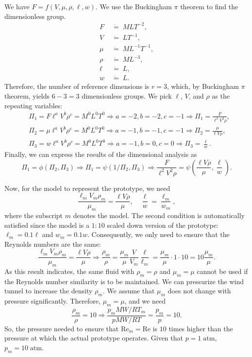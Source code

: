 \documentclass[12pt]{article}
\begin{document}
\begin{ex}
\begin{solution}
  We have $F=f(V,\mu,\rho,\ell,w)$. We use the Buckingham $\pi$ theorem to find the dimensionless group.
  \begin{align*}
    F&\;\dot{=}\;MLT^{-2},\\
    V&\;\dot{=}\;LT^{-1},\\
    \mu&\;\dot{=}\;ML^{-1}T^{-1},\\
    \rho&\;\dot{=}\;ML^{-3},\\
    \ell&\;\dot{=}\;L,\\
    w&\;\dot{=}\;L.
  \end{align*}
  Therefore, the number of reference dimensions is $r=3$, which, by Buckingham $\pi$ theorem, yields $6-3=3$ dimensionless groups. We pick $\ell$, $V$, and $\rho$ as the repeating variables:
  \begin{align*}
    &\Pi_1=F\ell^aV^b\rho^c=M^0L^0T^0\Rightarrow a=-2,b=-2,c=-1\Rightarrow \Pi_1=\frac{F}{\ell^2V^2\rho},\\
    &\Pi_2=\mu\ell^aV^b\rho^c=M^0L^0T^0\Rightarrow a=-1,b=-1,c=-1\Rightarrow \Pi_2=\frac{\mu}{\ell V\rho},\\
    &\Pi_3=w\ell^aV^b\rho^c=M^0L^0T^0\Rightarrow a=-1,b=0,c=0\Rightarrow \Pi_3=\frac{\ell}{w}.
  \end{align*}
  Finally, we can express the results of the dimensional analysis as
  \begin{equation*}
    \Pi_1=\phi\left(\Pi_2,\Pi_3\right)\Rightarrow\Pi_1=\psi\left(1/\Pi_2,\Pi_3\right)\Rightarrow\frac{F}{\ell^2V^2\rho}=\psi\left(\frac{\ell V\rho}{\mu},\frac{\ell}{w}\right).
  \end{equation*}

  Now, for the model to represent the prototype, we need
  \begin{equation*}
    \frac{\ell_m V_m\rho_m}{\mu_m}=\frac{\ell V\rho}{\mu},\quad \frac{\ell}{w}=\frac{\ell_m}{w_m},
  \end{equation*}
  where the subscript $m$ denotes the model. The second condition is automatically satisfied since the model is a $1:10$ scaled down version of the prototype: $\ell_m=0.1\ell$ and $w_m=0.1w$. Consequently, we only need to ensure that the Reynolds numbers are the same:
  \begin{equation*}
    \frac{\ell_m V_m\rho_m}{\mu_m}=\frac{\ell V\rho}{\mu}\Rightarrow\frac{\rho_m}{\rho}=\frac{\mu_m}{\mu}\frac{V}{V_m}\frac{\ell}{\ell_m}=\frac{\mu_m}{\mu}\cdot 1\cdot 10=10\frac{\mu_m}{\mu}.
  \end{equation*}
  As this result indicates, the same fluid with $\rho_m=\rho$ and $\mu_m=\mu$ cannot be used if the Reynolds number similarity is to be maintained. We can pressurize the wind tunnel to increase the density $\rho_m$. We assume that $\mu_m$ does not change with pressure significantly. Therefore, $\mu_m=\mu$, and we need
  \begin{equation*}
    \frac{\rho_m}{\rho}=10\Rightarrow \frac{p_m MW/RT_m}{p MW/RT}=\frac{p_m}{p}=10.
  \end{equation*}
  So, the pressure needed to ensure that $\mathrm{Re}_m=\mathrm{Re}$ is $10$ times higher than the pressure at which the actual prototype operates. Given that $p=1\;\mathrm{atm}$, $p_m=10\;\mathrm{atm}$.


\end{solution}
\end{ex}
\end{document}
